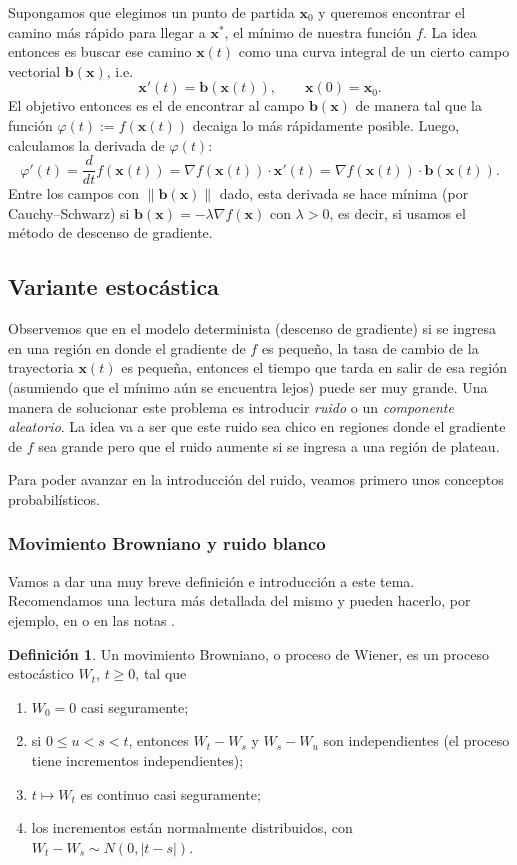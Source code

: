 \documentclass[12pt, a4paper]{amsbook}
\newcommand{\xx}{{\mathbf x}}
\newcommand{\bb}{{\mathbf b}}
\theoremstyle{remark}
\theoremstyle{definition}
\newtheorem{defi}[teo]{Definici\'on}
\numberwithin{section}{chapter}
\numberwithin{subsection}{section}
\numberwithin{equation}{section}
\numberwithin{figure}{chapter}
\begin{document}
Supongamos que elegimos un punto de partida $\xx_0$ y queremos encontrar el camino más rápido para llegar a $\xx^*$, el mínimo de nuestra función $f$. La idea entonces es buscar ese camino $\xx(t)$ como una curva integral de un cierto campo vectorial $\bb(\xx)$, i.e.
$$
\xx'(t) = \bb(\xx(t)),\qquad \xx(0)=\xx_0.
$$
El objetivo entonces es el de encontrar al campo $\bb(\xx)$ de manera tal que la función $\varphi(t) := f(\xx(t))$ decaiga lo más rápidamente posible. Luego, calculamos la derivada de $\varphi(t)$:
$$
\varphi'(t) = \frac{d}{dt}f(\xx(t)) = \nabla f(\xx(t)) \cdot \xx'(t) = \nabla f(\xx(t))\cdot \bb(\xx(t)).
$$
Entre los campos con $\|\bb(\xx)\|$ dado, esta derivada se hace mínima (por Cauchy--Schwarz) si $\bb(\xx) = -\lambda\nabla f(\xx)$ con $\lambda>0$, es decir, si usamos el método de descenso de gradiente.

\subsection{Variante estocástica}

Observemos que en el modelo determinista (descenso de gradiente) si se ingresa en una región en donde el gradiente de $f$ es pequeño, la tasa de cambio de la trayectoria $\xx(t)$ es pequeña, entonces el tiempo que tarda en salir de esa región (asumiendo que el mínimo aún se encuentra lejos) puede ser muy grande. Una manera de solucionar este problema es introducir {\em ruido} o un {\em componente aleatorio}. La idea va a ser que este ruido sea chico en regiones donde el gradiente de $f$ sea grande pero que el ruido aumente si se ingresa a una región de plateau.

Para poder avanzar en la introducción del ruido, veamos primero unos conceptos probabilísticos.

\subsubsection{Movimiento Browniano y ruido blanco}
Vamos a dar una muy breve definición e introducción a este tema. Recomendamos una lectura más detallada del mismo y pueden hacerlo, por ejemplo, en \cite{Dynkin, Evans} o en las notas \cite{Bonder-Groisman}.

\begin{defi}\label{defi.W}
Un movimiento Browniano, o proceso de Wiener, es un proceso estocástico $W_t$, $t\ge 0$, tal que
\begin{enumerate}
\item $W_0=0$ casi seguramente;\label{W1}

\item si $0\le u<s<t$, entonces $W_t-W_s$ y $W_s-W_u$ son independientes (el proceso tiene incrementos independientes);\label{W2}

\item $t\mapsto W_t$ es continuo casi seguramente;\label{W3}

\item los incrementos están normalmente distribuidos, con $W_t-W_s \sim N(0,|t-s|)$.\label{W4}
\end{enumerate}
\end{defi}
\end{document}
